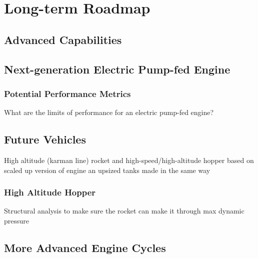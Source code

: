\documentclass[12pt, letterpaper]{article}
\begin{document}
\section{Long-term Roadmap}
\subsection{Advanced Capabilities}
\subsection{Next-generation Electric Pump-fed Engine}
\subsubsection{Potential Performance Metrics}
What are the limits of performance for an electric pump-fed engine?

\subsection{Future Vehicles}
High altitude (karman line) rocket and high-speed/high-altitude hopper based on scaled up version of engine an upsized tanks made in the same way

\subsubsection{High Altitude Hopper}
Structural analysis to make sure the rocket can make it through max dynamic pressure
\subsection{More Advanced Engine Cycles}
\end{document}
